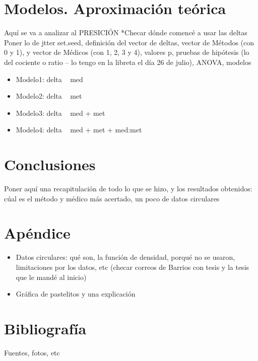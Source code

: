 \documentclass{article}
\begin{document}
	\section{Modelos. Aproximación teórica}
	Aquí se va a analizar al PRESICIÓN
	*Checar dónde comencé a usar las deltas
	Poner lo de jtter set.seed, definición del vector de deltas, vector de Métodos (con 0 y 1), y vector de Médicos (con 1, 2, 3 y 4), valores p, pruebas de hipótesis (lo del cociente o ratio -- lo tengo en la libreta el día 26 de julio), ANOVA, modelos
		\begin{itemize}
			\item Modelo1: delta ~ med
			\item Modelo2: delta ~ met
			\item Modelo3: delta ~ med + met
			\item Modelo4: delta ~ med + met + med:met
		\end{itemize}
		
	
	\section{Conclusiones}
	Poner aquí una recapitulación de todo lo que se hizo, y los resultados obtenidos: cúal es el método y médico más acertado, un poco de datos circulares
	
	
	\section{Apéndice}
		\begin{itemize}
			\item Datos circulares: qué son, la función de densidad, porqué no se usaron, limitaciones por los datos, etc (checar correos de Barrios con tesis y la tesis que le mandé al inicio)
			\item Gráfica de pastelitos y una explicación
		\end{itemize}
	
	\section{Bibliografía}
	Fuentes, fotos, etc
	
\end{document}
